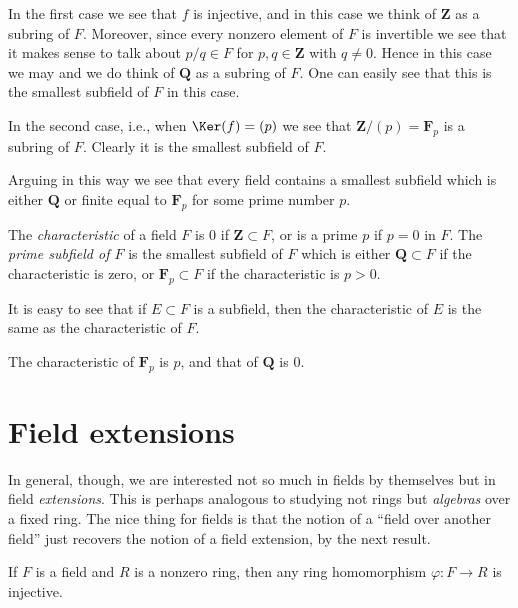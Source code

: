 \medskip\noindent
In the first case we see that $f$ is injective, and in this case
we think of $\mathbf{Z}$ as a subring of $F$. Moreover, since every
nonzero element of $F$ is invertible we see that it makes sense to
talk about $p/q \in F$ for $p, q \in \mathbf{Z}$ with $q \not = 0$.
Hence in this case we may and we do think of $\mathbf{Q}$ as a subring of $F$.
One can easily see that this is the smallest subfield of $F$ in this case.

\medskip\noindent
In the second case, i.e., when $\Ker(f) = (p)$ we see that
$\mathbf{Z}/(p) = \mathbf{F}_p$ is a subring of $F$. Clearly it is the
smallest subfield of $F$.

\medskip\noindent
Arguing in this way we see that every field contains a smallest subfield
which is either $\mathbf{Q}$ or finite equal to $\mathbf{F}_p$ for some
prime number $p$.

\begin{definition}
\label{definition-characteristic}
The {\it characteristic} of a field $F$ is $0$ if
$\mathbf{Z} \subset F$, or is a prime $p$ if $p = 0$ in $F$.
The {\it prime subfield of $F$} is the smallest subfield of $F$
which is either $\mathbf{Q} \subset F$ if the characteristic is zero, or
$\mathbf{F}_p \subset F$ if the characteristic is $p > 0$.
\end{definition}

\noindent
It is easy to see that if $E \subset F$ is a subfield, then the
characteristic of $E$ is the same as the characteristic of $F$.

\begin{example}
\label{example-characteristic}
The characteristic of $\mathbf{F}_p$ is $p$, and that of $\mathbf{Q}$ is $0$.
\end{example}


\section{Field extensions}
\label{section-extensions}

\noindent
In general, though, we are interested not so much in fields by themselves but
in field {\it extensions}. This is perhaps analogous to studying not rings
but {\it algebras} over a fixed ring.
The nice thing for fields is that the notion of a ``field over another field''
just recovers the notion of a field extension, by the next result.

\begin{lemma}
\label{lemma-field-maps-injective}
If $F$ is a field and $R$ is a nonzero ring, then any ring homomorphism
$\varphi : F \to R$ is injective.
\end{lemma}

